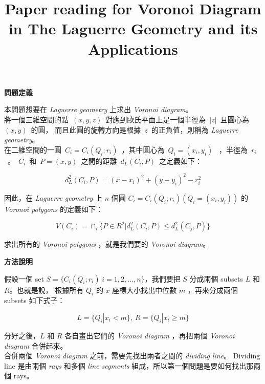 \documentclass[12pt]{article}
\title{\bf{Paper reading for Voronoi Diagram in The Laguerre Geometry and its Applications}}
\date{}
\begin{document}
\maketitle

\begin{CJK}{UTF8}{bkai}

\centerline{\bf 問題定義}

本問題想要在 {\it Laguerre geometry} 上求出 {\it Voronoi diagram}。\\

將一個三維空間的點~$(x,y,z)$~對應到歐氏平面上是一個半徑為~$|z|$~且圓心為~$(x,y)$~的圓，
而且此圓的旋轉方向是根據~$z$~的正負值，則稱為 {\it Laguerre geometry}。\\

在二維空間的一圓~$C_i=C_i(Q_i;r_i)$~，其中圓心為~$Q_i=(x_i,y_i)$~
，半徑為~$r_i$~。~$C_i$~和~$P=(x,y)$~之間的距離~$d_L(C_i,P)$~之定義如下：

\begin{equation}
d_L^2(C_i,P)=(x-x_i)^2+(y-y_i)^2-r_i^2
\end{equation}

因此，在 {\it Laguerre geometry} 上 $n$ 個圓 $C_i=C_i(Q_i;r_i)(Q_i=(x_i,y_i))$ 的 {\it Voronoi polygons} 的定義如下：

\begin{equation}
V(C_i)=\cap_i \{P \in R^2 | d_L^2(C_i,P) \leq d_L^2(C_j,P) \}
\end{equation}

求出所有的 {\it Voronoi polygons} ，就是我們要的 {\it Voronoi diagram}。\\


\centerline{\bf 方法說明}

假設一個 set $S=\{C_i(Q_i;r_i)|i=1,2,...,n\}$，我們要把 $S$ 分成兩個 subsets $L$ 和 $R$。也就是說，
根據所有 $Q_i$ 的 $x$ 座標大小找出中位數 $m$ ，再來分成兩個 subsets 如下式子：

\[
L=\{Q_i| x_i < m \},~R=\{Q_i| x_i \geq m \}
\]

分好之後，$L$ 和 $R$ 各自畫出它們的 {\it Voronoi diagram} ，再把兩個 {\it Voronoi diagram} 合併起來。\\


合併兩個 {\it Voronoi diagram} 之前，需要先找出兩者之間的 {\it dividing line}。 Dividing line
 是由兩個 {\it rays} 和多個 {\it line segments} 組成，所以第一個問題是要如何找出那兩個 rays。\\



\end{CJK}
\end{document}
